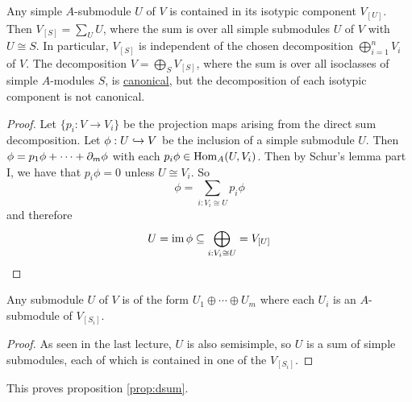 \begin{thm}
	Any simple $A$-submodule $U$ of $V$ is contained in its isotypic component $V_{[U]}$.
	Then $V_{[S]} = \sum_U U$, where the sum is over all simple submodules $U$ of $V$ with $U \cong S$.
	In particular, $V_{[S]}$ is independent of the chosen decomposition $\bigoplus_{i=1}^n V_i$ of $V$.
	The decomposition $V = \bigoplus_S V_{[S]}$, where the sum is over all isoclasses of simple $A$-modules $S$, is \underline{canonical}, but the decomposition of each isotypic component is not canonical.
\end{thm}

\begin{proof}
	Let $\{p_i: V \to V_i\}$ be the projection maps arising from the direct sum decomposition.
	Let $\phi: U \hookrightarrow V$ be the inclusion of a simple submodule $U$.
	Then $\phi = p_1\phi + \cdots + \partial_m\phi$ with each $p_i\phi \in \operatorname{Hom}_A(U,V_i)$.
	Then by Schur's lemma part I, we have that $p_i\phi=0$ unless $U \cong V_i$.
	So
	\[\phi = \sum_{i: V_i \cong U} p_i\phi\]
	and therefore
	\[U = \operatorname{im}\phi \subseteq \bigoplus_{i: V_i \cong U} = V_{[U]} \qedhere\]
\end{proof}

\begin{cor}
	Any submodule $U$ of $V$ is of the form $U_1 \oplus \cdots \oplus U_m$ where each $U_i$ is an $A$-submodule of $V_{[S_i]}$.
\end{cor}

\begin{proof}
	As seen in the last lecture, $U$ is also semisimple, so $U$ is a sum of simple submodules, each of which is contained in one of the $V_{[S_i]}$.
\end{proof}

\begin{rmk}
	This proves proposition \ref{prop:dsum}.
\end{rmk}